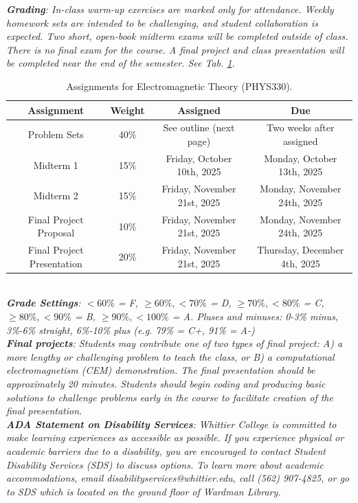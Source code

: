 \documentclass[10pt]{article}
\begin{document}
\textit{\textbf{Grading}: In-class warm-up exercises are marked only for attendance.  Weekly homework sets are intended to be challenging, and student collaboration is expected.  Two short, open-book midterm exams will be completed outside of class.  There is no final exam for the course.  A final project and class presentation will be completed near the end of the semester.  See Tab. \ref{tab:grading}.}
\begin{table}
\centering
\begin{tabular}{| c | c | c | c |}
\hline
\textbf{Assignment} & \textbf{Weight} & \textbf{Assigned} & \textbf{Due}\\ \hline
Problem Sets & 40\% & See outline (next page) & Two weeks after assigned \\ \hline
Midterm 1 & 15\% & Friday, October 10th, 2025 & Monday, October 13th, 2025 \\ \hline
Midterm 2 & 15\% & Friday, November 21st, 2025 & Monday, November 24th, 2025 \\ \hline
Final Project Proposal & 10\% & Friday, November 21st, 2025 & Monday, November 24th, 2025 \\ \hline
Final Project Presentation & 20\% & Friday, November 21st, 2025 & Thursday, December 4th, 2025 \\ \hline
\end{tabular}
\caption{\label{tab:grading} Assignments for Electromagnetic Theory (PHYS330).}
\end{table} \\
\textit{\textbf{Grade Settings}: $<60\%$ = F, $\geq 60\%, <70\%$ = D, $\geq 70\%, <80\%$ = C, $\geq 80\%, <90\%$ = B, $\geq 90\%, <100\%$ = A.  Pluses and minuses: 0-3\% minus, 3\%-6\% straight, 6\%-10\% plus (e.g. 79\% = C+, 91\% = A-)} \\
\textit{\textbf{Final projects}: Students may contribute one of two types of final project: A) a more lengthy or challenging problem to teach the class, or B) a computational electromagnetism (CEM) demonstration.  The final presentation should be approximately 20 minutes.  Students should begin coding and producing basic solutions to challenge problems early in the course to facilitate creation of the final presentation.} \\
\textit{\textbf{ADA Statement on Disability Services}: Whittier College is committed to make learning experiences as accessible as possible. If you experience physical or academic barriers due to a disability, you are encouraged to contact Student Disability Services (SDS) to discuss options. To learn more about academic accommodations, email disabilityservices@whittier.edu, call (562) 907-4825, or go to SDS which is located on the ground floor of Wardman Library.} \\
\end{document}
